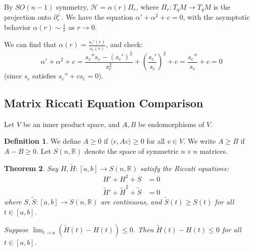 \documentclass[11pt, a4paper]{article}
\theoremstyle{plain}
\newtheorem{theorem}{Theorem}[section]
\theoremstyle{definition}
\newtheorem{definition}[theorem]{Definition}
\theoremstyle{remark}
\begin{document}
{By $SO(n-1)$ symmetry, $\mathcal{H} = \alpha(r) \Pi_r$, where $\Pi_r: T_qM \to T_qM$ is the projection onto $\partial_r^\perp$.
We have the equation $\alpha' + \alpha^2 + c = 0$, with the asymptotic behavior $\alpha(r) \sim \frac{1}{r}$ as $r \to 0$.

We can find that $\alpha(r) = \frac{s_c'(r)}{s_c(r)}$, and check:
\[ \alpha' + \alpha^2 + c = \frac{s_c'' s_c - (s_c')^2}{s_c^2} + \left(\frac{s_c'}{s_c}\right)^2 + c = \frac{s_c''}{s_c} + c = 0 \]
(since $s_c$ satisfies $s_c'' + c s_c = 0$).

\subsection{Matrix Riccati Equation Comparison}

Let $V$ be an inner product space, and $A, B$ be endomorphisms of $V$.

\begin{definition}
We define $A \ge 0$ if $\langle v, Av \rangle \ge 0$ for all $v \in V$. We write $A \ge B$ if $A - B \ge 0$.
Let $S(n, \mathbb{R})$ denote the space of symmetric $n \times n$ matrices.
\end{definition}

\begin{theorem}
Say $H, \tilde{H} :[a,b] \to S(n, \mathbb{R})$ satisfy the Riccati equations:
\begin{align*}
    H' + H^2 + S &= 0 \\
    \tilde{H}' + \tilde{H}^2 + \tilde{S} &= 0
\end{align*}
where $S, \tilde{S} : [a,b] \to S(n, \mathbb{R})$ are continuous, and $\tilde{S}(t) \ge S(t)$ for all $t \in [a,b]$.

Suppose $\lim_{t \to a} (\tilde{H}(t) - H(t)) \le 0$. Then $\tilde{H}(t) - H(t) \le 0$ for all $t \in [a,b]$.
\end{theorem}
}
\newpage
\end{document}
